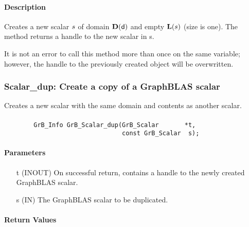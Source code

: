 \paragraph{Description}

Creates a new scalar ${s}$ of domain $\mathbf{D}({\sf d})$ and empty 
$\mathbf{L}({s})$ (size is one). The method returns a handle to the new scalar in {\sf s}.

It is not an error to call this method more than once on the same variable;  
however, the handle to the previously created object will be overwritten. 

\subsubsection{{\sf Scalar\_dup}: Create a copy of a GraphBLAS scalar}

Creates a new scalar with the same domain and contents as another scalar.

\paragraph{\syntax}

\begin{verbatim}
        GrB_Info GrB_Scalar_dup(GrB_Scalar       *t,
                                const GrB_Scalar  s);
\end{verbatim}

\paragraph{Parameters}

\begin{itemize}[leftmargin=1.1in]
    \item[{\sf t}]  ({\sf INOUT}) On successful return, contains a handle
                                  to the newly created GraphBLAS scalar.
    \item[{\sf s}]  ({\sf IN})    The GraphBLAS scalar to be duplicated.
\end{itemize}

\paragraph{Return Values}

